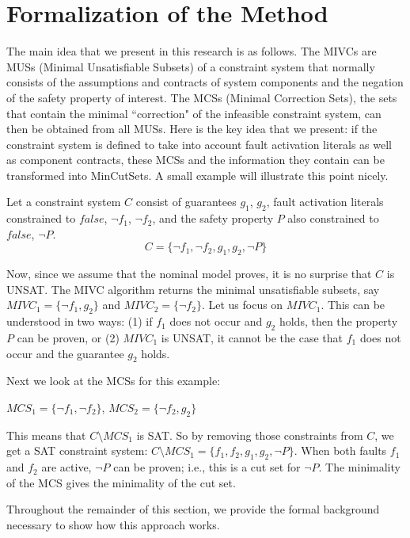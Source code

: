 \section{Formalization of the Method}
The main idea that we present in this research is as follows. The MIVCs are MUSs (Minimal Unsatisfiable Subsets) of a constraint system that normally consists of the assumptions and contracts of system components and the negation of the safety property of interest. The MCSs (Minimal Correction Sets), the sets that contain the minimal ``correction" of the infeasible constraint system, can then be obtained from all MUSs. Here is the key idea that we present: if the constraint system is defined to take into account fault activation literals as well as component contracts, these MCSs and the information they contain can be transformed into MinCutSets. A small example will illustrate this point nicely. 

Let a constraint system $C$ consist of guarantees $g_1$, $g_2$, fault activation literals constrained to $false$, $\neg f_1$, $\neg f_2$, and the safety property $P$ also constrained to $false$, $\neg P$. 
\begin{equation}
    C = \{\neg f_1, \neg f_2, g_1, g_2, \neg P\}
\end{equation}

Now, since we assume that the nominal model proves, it is no surprise that $C$ is UNSAT. The MIVC algorithm returns the minimal unsatisfiable subsets, say $MIVC_1 = \{\neg f_1, g_2\}$ and $MIVC_2 = \{\neg f_2\}$. Let us focus on $MIVC_1$. This can be understood in two ways: (1) if $f_1$ does not occur and $g_2$ holds, then the property $P$ can be proven, or (2) $MIVC_1$ is UNSAT, it cannot be the case that $f_1$ does not occur and the guarantee $g_2$ holds. 

Next we look at the MCSs for this example:
\begin{center}
    $MCS_1 = \{\neg f_1, \neg f_2\}$,
    $MCS_2 = \{\neg f_2, g_2\}$
\end{center}

This means that $C \setminus MCS_1$ is SAT. So by removing those constraints from $C$, we get a SAT constraint system: $C \setminus MCS_1 = \{f_1, f_2, g_1, g_2, \neg P\}$. When both faults $f_1$ and $f_2$ are active, $\neg P$ can be proven; i.e., this is a cut set for $\neg P$. The minimality of the MCS gives the minimality of the cut set. 

Throughout the remainder of this section, we provide the formal background necessary to show how this approach works.


